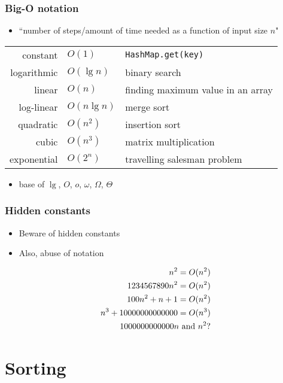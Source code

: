 \documentclass{beamer}
\begin{document}
\begin{frame}
 \frametitle{Big-O notation}
 \begin{itemize}
  \item ``number of steps/amount of time needed as a function of input
        size $n$"
 \end{itemize}
 \begin{center}
 \begin{tabular}{rll}
  constant & $O(1)$ & \texttt{HashMap.get(key)} \\
  logarithmic & $O(\lg n)$ & binary search \\
  linear & $O(n)$ & finding maximum value in an array \\
  log-linear & $O(n \lg n)$ & merge sort \\
  quadratic & $O(n^2)$ & insertion sort \\
  cubic & $O(n^3)$ & matrix multiplication \\
  exponential & $O(2^n)$ & travelling salesman problem \\
 \end{tabular}
 \end{center}
 \begin{itemize}
  \item base of $\lg$, $O$, $o$, $\omega$, $\Omega$, $\Theta$
 \end{itemize}
\end{frame}

\begin{frame}
 \frametitle{Hidden constants}
 \begin{itemize}
  \item Beware of hidden constants
  \item Also, abuse of notation
 \end{itemize}
 \begin{align*}
  n^2 = O(n^2) \\
  1234567890n^2 = O(n^2) \\
  100n^2 + n + 1 = O(n^2) \\
  n^3 + 10000000000000 = O(n^3) \\
  1000000000000n \textnormal{ and } n^2 \textnormal{?} \\
 \end{align*}
\end{frame}

\section{Sorting}
\end{document}
